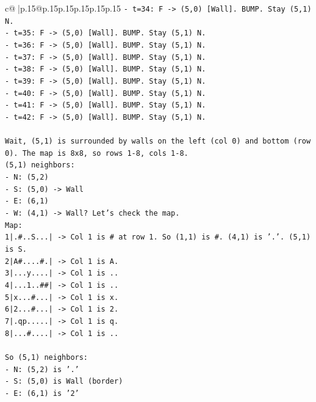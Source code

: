 \documentclass{article}
\begin{document}
{\begin{supertabular}{c@{$\;$}|p{.15\linewidth}@{}p{.15\linewidth}p{.15\linewidth}p{.15\linewidth}p{.15\linewidth}p{.15\linewidth}}
{{{\texttt{{-} t=34: F {-}> (5,0) {[}Wall{]}. BUMP. Stay (5,1) N.} \\
\texttt{{-} t=35: F {-}> (5,0) {[}Wall{]}. BUMP. Stay (5,1) N.} \\
\texttt{{-} t=36: F {-}> (5,0) {[}Wall{]}. BUMP. Stay (5,1) N.} \\
\texttt{{-} t=37: F {-}> (5,0) {[}Wall{]}. BUMP. Stay (5,1) N.} \\
\texttt{{-} t=38: F {-}> (5,0) {[}Wall{]}. BUMP. Stay (5,1) N.} \\
\texttt{{-} t=39: F {-}> (5,0) {[}Wall{]}. BUMP. Stay (5,1) N.} \\
\texttt{{-} t=40: F {-}> (5,0) {[}Wall{]}. BUMP. Stay (5,1) N.} \\
\texttt{{-} t=41: F {-}> (5,0) {[}Wall{]}. BUMP. Stay (5,1) N.} \\
\texttt{{-} t=42: F {-}> (5,0) {[}Wall{]}. BUMP. Stay (5,1) N.} \\
\\ 
\texttt{Wait, (5,1) is surrounded by walls on the left (col 0) and bottom (row 0). The map is 8x8, so rows 1{-}8, cols 1{-}8.} \\
\texttt{(5,1) neighbors:} \\
\texttt{{-} N: (5,2)} \\
\texttt{{-} S: (5,0) {-}> Wall} \\
\texttt{{-} E: (6,1)} \\
\texttt{{-} W: (4,1) {-}> Wall? Let's check the map.} \\
\texttt{Map:} \\
\texttt{1|.\#..S...| {-}> Col 1 is \# at row 1. So (1,1) is \#. (4,1) is '.'. (5,1) is S.} \\
\texttt{2|A\#....\#.| {-}> Col 1 is A.} \\
\texttt{3|...y....| {-}> Col 1 is ..} \\
\texttt{4|...1..\#\#| {-}> Col 1 is ..} \\
\texttt{5|x...\#...| {-}> Col 1 is x.} \\
\texttt{6|2...\#...| {-}> Col 1 is 2.} \\
\texttt{7|.qp.....| {-}> Col 1 is q.} \\
\texttt{8|...\#....| {-}> Col 1 is ..} \\
\\ 
\texttt{So (5,1) neighbors:} \\
\texttt{{-} N: (5,2) is '.'} \\
\texttt{{-} S: (5,0) is Wall (border)} \\
\texttt{{-} E: (6,1) is '2'} \\
}}}
\end{supertabular}}
\end{document}
